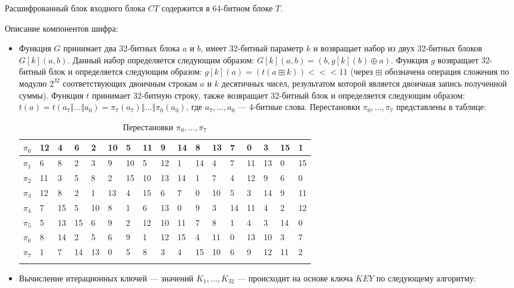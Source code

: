 \documentclass{./civarticle}
\begin{document}
Расшифрованный блок входного блока $CT$ содержится в 64-битном блоке $T$.

Описание компонентов шифра:

\begin{itemize}

    \item Функция $G$ принимает два 32-битных блока $a$ и $b$, имеет 32-битный параметр $k$ и возвращает набор из двух 32-битных блоков $G[k](a, b)$. Данный набор определяется следующим образом: $G[k](a, b) = (b, g[k](b) \oplus a)$. Функция $g$ возвращает 32-битный блок и определяется следующим образом: $g[k](a) = (t(a \boxplus k)) <<< 11$ (через $\boxplus$ обозначена операция сложения по модулю $2^{32}$ соответствующих двоичным строкам $a$ и $k$ десятичных чисел, результатом которой является двоичная запись полученной суммы). Функция $t$ принимает 32-битную строку, также возвращает 32-битный блок и определяется следующим образом: $t(a) = t(a_7 \mathbin\Vert ... \mathbin\Vert a_0) = \pi_7(a_7) \mathbin\Vert ... \mathbin\Vert \pi_0(a_0)$, где $a_7, ..., a_0$ --- 4-битные слова. Перестановки $\pi_0, ..., \pi_7$ представлены в таблице:

    \begin{longtable}{|p{0.5cm}|p{0.5cm}|p{0.5cm}|p{0.5cm}|p{0.5cm}|p{0.5cm}|p{0.5cm}|p{0.5cm}|p{0.5cm}|p{0.5cm}|p{0.5cm}|p{0.5cm}|p{0.5cm}|p{0.5cm}|p{0.5cm}|p{0.5cm}|p{0.5cm}|}
\hline
$\pi_0$ & 12 & 4 & 6 & 2 & 10 & 5 & 11 & 9 & 14 & 8 & 13 & 7 & 0 & 3 & 15 & 1 \\
\hline
$\pi_1$ & 6 & 8 & 2 & 3 & 9 & 10 & 5 & 12 & 1 & 14 & 4 & 7 & 11 & 13 & 0 & 15 \\
\hline
$\pi_2$ & 11 & 3 & 5 & 8 & 2 & 15 & 10 & 13	& 14 & 1 & 7 & 4 & 12 & 9 & 6 & 0 \\
\hline
$\pi_3$ & 12 & 8 & 2 & 1 & 13 & 4 & 15 & 6 & 7 & 0 & 10 & 5 & 3 & 14 & 9 & 11 \\
\hline
$\pi_4$ & 7 & 15 & 5 & 10 & 8 & 1 & 6 & 13 & 0 & 9 & 3 & 14 & 11 & 4 & 2 & 12 \\
\hline
$\pi_5$ & 5 & 13 & 15 & 6 & 9 & 2 & 12 & 10 & 11 & 7 & 8 & 1 & 4 & 3 & 14 & 0 \\
\hline
$\pi_6$ & 8 & 14 & 2 & 5 & 6 & 9 & 1 & 12 & 15 & 4 & 11 & 0 & 13 & 10 & 3 & 7 \\
\hline
$\pi_7$ & 1 & 7 & 14 & 13 & 0 & 5 & 8 & 3 & 4 & 15 & 10	& 6 & 9 & 12 & 11 & 2 \\
\hline
\caption{Перестановки $\pi_0, ..., \pi_7$}
\end{longtable}

    \item Вычисление итерационных ключей --- значений $K_1, ..., K_{32}$ --- происходит на основе ключа $KEY$ по следующему алгоритму:


\end{itemize}
\end{document}
